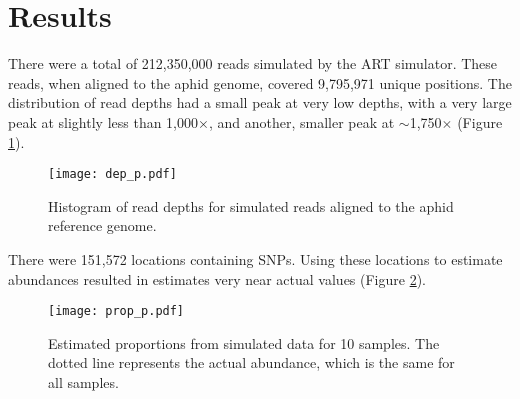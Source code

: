 
\section{Results}

There were a total of 212,350,000 reads simulated by the ART simulator.
These reads, when aligned to the aphid genome, covered 9,795,971 unique positions.
The distribution of read depths had a small peak at very low depths, with a very large
peak at slightly less than 1,000$\times$, and another, smaller peak at $\sim$1,750$\times$
(Figure \ref{fig:depth}).

\begin{figure}[!ht]
    \centering
    \texttt{[image: dep\_p.pdf]}
    \caption{Histogram of read depths for simulated reads aligned to the aphid reference
        genome.}
    \label{fig:depth}
\end{figure}

There were 151,572 locations containing SNPs. Using these locations to estimate 
abundances resulted in estimates very near actual values (Figure \ref{fig:proportions}).

\begin{figure}[!ht]
    \centering
    \texttt{[image: prop\_p.pdf]}
    \caption{Estimated proportions from simulated data for 10 samples.
             The dotted line represents the actual abundance, which is the same for 
             all samples.}
    \label{fig:proportions}
\end{figure}

